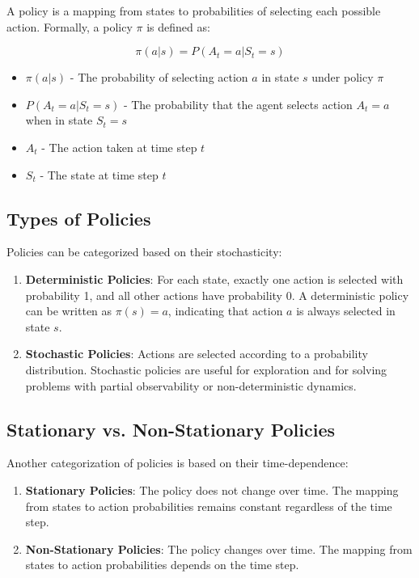 \documentclass[12pt,a4paper]{article}
\begin{document}
A policy is a mapping from states to probabilities of selecting each possible action. Formally, a policy $\pi$ is defined as:

\begin{equation}
\pi(a|s) = P(A_t = a | S_t = s)
\end{equation}

\begin{tcolorbox}[title=Notation Overview]
\begin{itemize}
    \item $\pi(a|s)$ - The probability of selecting action $a$ in state $s$ under policy $\pi$
    \item $P(A_t = a | S_t = s)$ - The probability that the agent selects action $A_t = a$ when in state $S_t = s$
    \item $A_t$ - The action taken at time step $t$
    \item $S_t$ - The state at time step $t$
\end{itemize}
\end{tcolorbox}

\subsection{Types of Policies}

Policies can be categorized based on their stochasticity:

\begin{enumerate}
    \item \textbf{Deterministic Policies}: For each state, exactly one action is selected with probability 1, and all other actions have probability 0. A deterministic policy can be written as $\pi(s) = a$, indicating that action $a$ is always selected in state $s$.
    
    \item \textbf{Stochastic Policies}: Actions are selected according to a probability distribution. Stochastic policies are useful for exploration and for solving problems with partial observability or non-deterministic dynamics.
\end{enumerate}

\subsection{Stationary vs. Non-Stationary Policies}

Another categorization of policies is based on their time-dependence:

\begin{enumerate}
    \item \textbf{Stationary Policies}: The policy does not change over time. The mapping from states to action probabilities remains constant regardless of the time step.
    
    \item \textbf{Non-Stationary Policies}: The policy changes over time. The mapping from states to action probabilities depends on the time step.
\end{enumerate}
\end{document}
